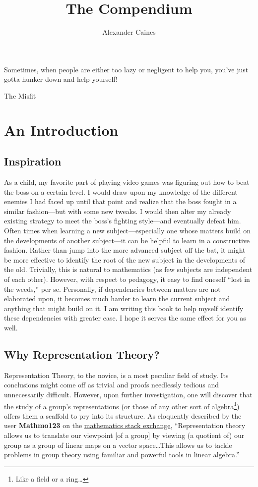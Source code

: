 \documentclass[11pt]{book}
\title{{\bf The Compendium}}
\author{Alexander Caines}
\begin{document}
\maketitle

\newpage
\epigraph{Sometimes, when people are either too lazy or negligent to help you, you've just
gotta hunker down and help yourself!}{The Misfit}
\newpage

\tableofcontents
\newpage

\section{An Introduction}
\subsection{Inspiration}
As a child, my favorite part of playing video games was figuring out how to beat the boss on a certain level. I would draw upon my 
knowledge of the different enemies I had faced up until that point and realize that the boss fought in a similar fashion---but with 
some new tweaks. I would then alter my already existing strategy to meet the boss's fighting style---and eventually defeat him.\\

Often times when learning a new subject---especially one whose matters build on the developments of another subject---it can be 
helpful to learn in a constructive fashion. Rather than jump into the more advanced subject off the bat, it might be more effective 
to identify the root of the new subject in the developments of the old. Trivially, this is natural to mathematics (as few subjects 
are independent of each other). However, with respect to pedagogy, it easy to find oneself ``lost in the weeds,'' per se. Personally, if 
dependencies between matters are not elaborated upon, it becomes much harder to learn the current subject and anything that might build on 
it. I am writing this book to help myself identify these dependencies with greater ease. I hope it serves the same effect for you as well.

\subsection{Why Representation Theory?}
Representation Theory, to the novice, is a most peculiar field of study. Its conclusions might come off as trivial and proofs needlessly 
tedious and unnecessarily difficult. However, upon further investigation, one will discover that the study of a group's representations
(or those of any other sort of algebra\footnote{Like a field or a ring\dots}) offers them a scaffold to pry into its structure. As 
eloquently described by the user \textbf{Mathmo123} on the \href{https://math.stackexchange.com/questions/1628464/what-is-representation-theory}{mathematics stack exchange},
``Representation theory allows us to translate our viewpoint [of a group] by viewing (a quotient of) our group as a group of linear
maps on a vector space\dots This allows us to tackle problems in group theory using familiar and powerful tools in linear algebra.''
\end{document}
